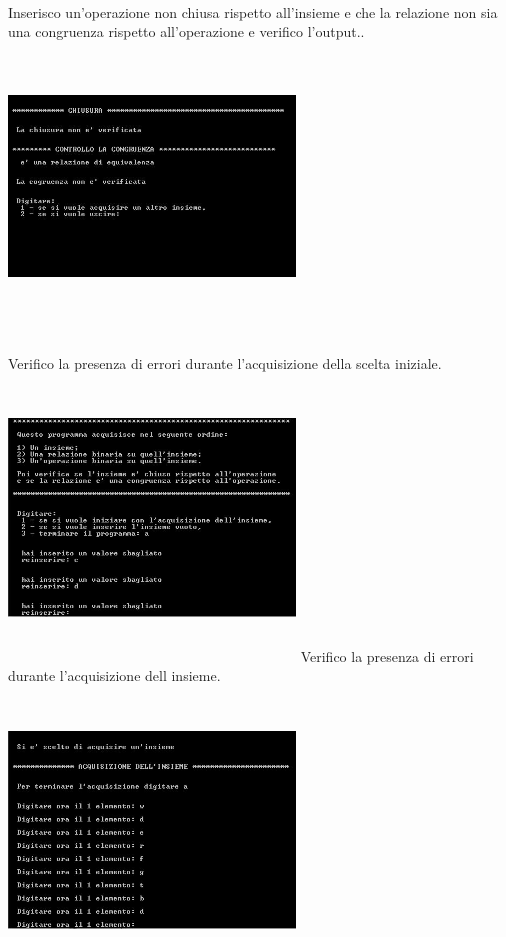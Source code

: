 ﻿\documentclass[11pt,a4paper,titlepage,block]{article}
\begin{document}
\\
\newpage
Inserisco un'operazione non chiusa rispetto all'insieme e che la relazione non sia una congruenza rispetto all'operazione e verifico l'output..\\
\includegraphics[width=3in,height=3in,viewport=0 0 300 300]{../Screenshots/Capture8.JPG}\\
\\
Verifico la presenza di errori durante l'acquisizione della scelta iniziale.\\
\includegraphics[width=3in,height=3in,viewport=0 0 300 300]{../Screenshots/Capture10.JPG}
\newpage
Verifico la presenza di errori durante l'acquisizione dell insieme.\\
\includegraphics[width=3in,height=3in,viewport=0 0 300 300]{../Screenshots/Capture11.JPG}\\
\end{document}
